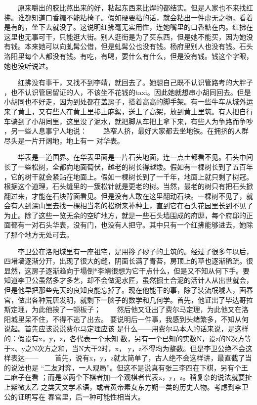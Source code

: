  　　原来嚼出的胶比熬出来的好，粘起东西来比焊的都结实。但是人家也不来找红 拂。谁都知道口香糖不能粘椅子。假如硬要粘的话，就会粘出一件虚无之物，看着 是有的，坐下去就没了。这说明红拂毫无实用性，连她嘴里的口香糖在内。红拂在 这里也无事可干，只能逛大街。别人逛街是为了买东西，但是她不能买，因为她没 有钱。本来她可以向虬髯公借，但是虬髯公也没有钱。杨府里别人也没有钱。石头 洛阳里每个人都没有钱。有吃，有喝，要什么有什么，但是没有钱。钱这个字眼， 她也没听说过。 

　　红拂没有事干，又找不到李靖，就回去了。她想自己既不认识管路考的大胖子 ，也不认识管居留证的人，不该坐不花钱的taxi。因此她就想串小胡同回去。但是 小胡同也不好走，因为到处都在盖房子，搭着高高的脚手架。有一些牛车从城外运 来了黄土，又有些人在黄土里掺上麻絮，送上了高架，放到黄土里筑。有人把自行 车骑到了小胡同里，这里没了泥水，就把脚从车把上拿下来，有些人为争路而争吵 ，另一些人息事宁人地说： 　　路窄人挤，最好大家都去坐地铁。在拥挤的人群尽头是一片开阔地，地上有一 对华表。

 　　华表是一道国界。在华表里面是一片石头地面，连一点土都看不见。石头中间 长了一些松树，全都向地面萄伏，越老的树长得越矮。假如有一棵树长到了五百年 ，它的树干就会紧贴在地面上。假如一棵树长到了一千年，地面上就只剩了树冠。 根据这个道理，石头缝里的一簇松针就是更老的树。当然，最老的树只有把石头掀 翻过来，才能在石块背面看见。但是没有人敢在这里翻动石块。一棵树不见了，就 会有人到深山里去找一棵相当老的松树来补种上，直到它在石头花园里长到不见了 为止。除了这些一览无余的空旷地方，就是一些石头墙围成的府邸，每个府邸的正 面都有一对石头华表，没有门，也没有人把守。其中只有一个红拂能够进去，她除 了那个地方无处可去。 

　　李卫公在洛阳城里有一座祖宅，是用搀了砂子的土筑的。经过了很多年以后， 四堵墙逐渐分开，出现了很大的缝，阴面长满了青苔，房顶上的草也逐渐稀疏。很 显然，这房子逐渐趋向于塌倒*李靖很想为它干点什么，但是又不知从何下手。要 知道李卫公虽然多才多艺，却不会做泥水匠，虽然掘土合泥的活计人从出世就会， 但是他早把那些先天的良知良能忘掉了。现在他能干的事，除了装流氓唬人，画春 宫，做出各种荒唐发明，就剩下一脑子的数学和几何学。首先，他证出了毕达哥拉 斯定理，为此他挨了一顿板子； 　　然后他又证出了费尔马定理，为此他又在洛阳城里呆不住，不得不逃了出去。 要说明后一件事，我感到头绪繁多，不知从何说起。首先应该说说费尔马定理应该 是什么——用费尔马本人的话来说，是这样的：假设有x，y，z，各代表一个未知 数，另有一个已知的实数N，设z的N次方等于x、y之N次方之和，当N大干2时，x， y，z不得均为整数。但是李卫公绝不会这样表达—— 　　首先，说有x，y，z就太简单了，古人绝不会这样讲，最直截了当的说法也是 “二友对弈，一人观局”。但这不是说真有张三李四在下棋，另有个王二麻子在看 ；而是以两个下棋者加一个观棋者代表x，y，z。稍复杂的说法就要扯上紫微太乙 之类天文学术语，或者黄帝素女东方朔一类的历史人物。考虑到李卫公的证明写在 春宫里，后一种可能性相当大。

